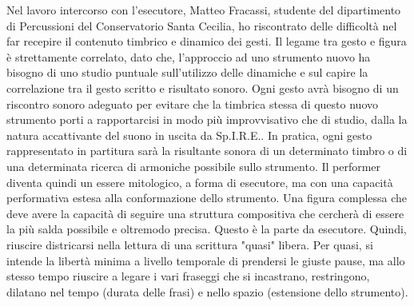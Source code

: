 Nel lavoro intercorso con l'esecutore, Matteo Fracassi, studente del dipartimento di Percussioni del Conservatorio Santa Cecilia, ho riscontrato delle difficoltà nel far recepire il contenuto timbrico e dinamico dei gesti. Il legame tra gesto e figura è strettamente correlato, dato che, l'approccio ad uno strumento nuovo ha bisogno di uno studio puntuale sull'utilizzo delle dinamiche e sul capire la correlazione tra il gesto scritto e risultato sonoro. Ogni gesto avrà bisogno di un riscontro sonoro adeguato per evitare che la timbrica stessa di questo nuovo strumento porti a rapportarcisi in modo più improvvisativo che di studio, dalla la natura accattivante del suono in uscita da Sp.I.R.E.. In pratica, ogni gesto rappresentato in partitura sarà la risultante sonora di un determinato timbro o di una determinata ricerca di armoniche possibile sullo strumento. Il performer diventa quindi un essere mitologico, a forma di esecutore, ma con una capacità performativa estesa alla conformazione dello strumento. Una figura complessa che deve avere la capacità di seguire una struttura compositiva che cercherà di essere la più salda possibile e oltremodo precisa. Questo è la parte da esecutore. Quindi, riuscire districarsi nella lettura di una scrittura "quasi" libera. Per quasi, si intende la libertà minima a livello temporale di prendersi le giuste pause, ma allo stesso tempo riuscire a legare i vari fraseggi che si incastrano, restringono, dilatano nel tempo (durata delle frasi) e nello spazio (estensione dello strumento).
